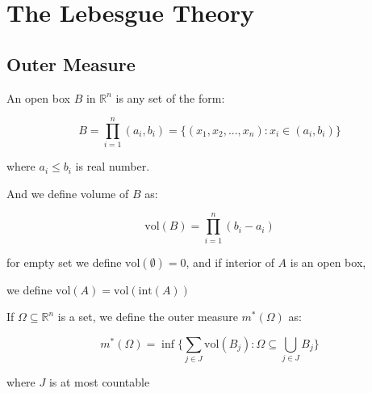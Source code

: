 \section{The Lebesgue Theory}

\subsection{Outer Measure}

\begin{definition}
    An open box $B$ in $\mathbb{R}^n$ is any set of the form:
    
    \[
        B = \prod_{i=1}^{n}(a_i, b_i) = \{(x_1,x_2,...,x_n): x_i \in (a_i, b_i) \}
    \]

    where $a_i \le b_i$ is real number.

    And we define volume of $B$ as:

    \[
        \mathrm{vol}(B) = \prod_{i=1}^{n}(b_i - a_i)
    \]

    for empty set we define $\mathrm{vol}(\emptyset) = 0$, and if interior of $A$ is an open box,

    we define $\mathrm{vol}(A) = \mathrm{vol}(\mathrm{int}(A))$
\end{definition}


\begin{definition}
    If $\Omega \subseteq \mathbb{R}^n$ is a set, we define the outer measure $m^*(\Omega)$ 
    as:

    \[
        m^*(\Omega) = \inf \{ \sum_{j \in J} \mathrm{vol}(B_j): \Omega \subseteq \bigcup_{j \in J}B_j\}
    \]

    where $J$ is at most countable
\end{definition}

